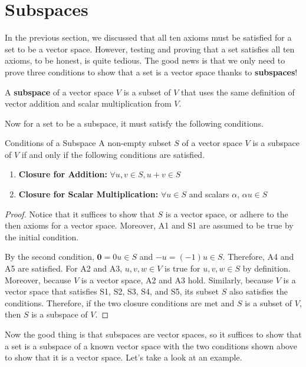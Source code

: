 \documentclass[../main.tex]{subfiles}
\begin{document}
\section{Subspaces}

In the previous section, we discussed that all ten axioms must be
satisfied for a set to be a vector space. However, testing and
proving that a set satisfies all ten axioms, to be honest, is quite
tedious. The good news is that we only need to prove three conditions
to show that a set is a vector space thanks to \textbf{subspaces}!

\begin{definition}{}{}
A \textbf{subspace} of a vector space $V$ is a subset of $V$ that uses
the same definition of vector addition and scalar multiplication from
$V$.
\end{definition}

Now for a set to be a subspace, it must satisfy the following
conditions.

\begin{theorem}{}{Conditions of a Subspace}
A non-empty subset $S$ of a vector space $V$ is a subspace of $V$ if
and only if the following conditions are satisfied.
\begin{enumerate}[noitemsep]
\item
\textbf{Closure for Addition: }
$\forall u, v \in S, u + v \in S$
\item
\textbf{Closure for Scalar Multiplication: }
$\forall u \in S$ and scalars $\alpha$, $\alpha u \in S$
\end{enumerate}
\end{theorem}
\begin{proof}
Notice that it suffices to show that $S$ is a vector space, or adhere
to the then axioms for a vector space. Moreover, A1 and S1 are assumed
to be true by the initial condition.

By the second condition, $\mathbf{0} = 0 u \in S$ and $-u = (-1) u
\in S$. Therefore, A4 and A5 are satisfied. For A2 and A3, $u, v, w
\in V$ is true for $u, v, w \in S$ by definition. Moreover, because
$V$ is a vector space, A2 and A3 hold. Similarly, because $V$ is a
vector space that satisfies S1, S2, S3, S4, and S5, its subset $S$
also satisfies the conditions. Therefore, if the two closure
conditions are met and $S$ is a subset of $V$, then $S$ is a subspace
of $V$.
\end{proof}

Now the good thing is that subspaces are vector spaces, so it suffices
to show that a set is a subspace of a known vector space with the two
conditions shown above to show that it is a vector space. Let's take
a look at an example.
\end{document}
